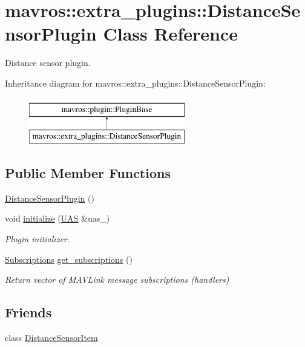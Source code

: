 \hypertarget{classmavros_1_1extra__plugins_1_1DistanceSensorPlugin}{}\section{mavros\+::extra\+\_\+plugins\+::Distance\+Sensor\+Plugin Class Reference}
\label{classmavros_1_1extra__plugins_1_1DistanceSensorPlugin}


Distance sensor plugin.  


Inheritance diagram for mavros\+::extra\+\_\+plugins\+::Distance\+Sensor\+Plugin\+:\begin{figure}[H]
\begin{center}
\leavevmode
\includegraphics[height=2.000000cm]{classmavros_1_1extra__plugins_1_1DistanceSensorPlugin}
\end{center}
\end{figure}
\subsection*{Public Member Functions}
\begin{DoxyCompactItemize}
\item 
\mbox{\hyperlink{group__plugin_gab36caa4b5744d09640626f1cc69671a0}{Distance\+Sensor\+Plugin}} ()
\item 
void \mbox{\hyperlink{group__plugin_gaea43cccb03d7eed62db5d9e9bfc3912a}{initialize}} (\mbox{\hyperlink{classmavros_1_1UAS}{U\+AS}} \&uas\+\_\+)
\begin{DoxyCompactList}\small\item\em Plugin initializer. \end{DoxyCompactList}\item 
\mbox{\hyperlink{group__plugin_ga8967d61fc77040e0c3ea5a4585d62a09}{Subscriptions}} \mbox{\hyperlink{group__plugin_gafe36c8c7308353863b1a33f4ca497159}{get\+\_\+subscriptions}} ()
\begin{DoxyCompactList}\small\item\em Return vector of M\+A\+V\+Link message subscriptions (handlers) \end{DoxyCompactList}\end{DoxyCompactItemize}
\subsection*{Friends}
\begin{DoxyCompactItemize}
\item 
class \mbox{\hyperlink{group__plugin_ga4926c3f115f5d91d3b0e1bdbffa71d18}{Distance\+Sensor\+Item}}
\end{DoxyCompactItemize}
